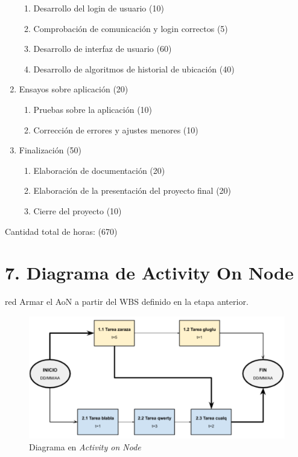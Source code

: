 \documentclass[11pt]{charter}
\begin{document}
\begin{enumerate}
\begin{enumerate}
	\item Desarrollo del login de usuario (10)
	\item Comprobación de comunicación y login correctos (5)
        \item Desarrollo de interfaz de usuario (60)
	\item Desarrollo de algoritmos de historial de ubicación (40)
	\end{enumerate}
\item Ensayos sobre aplicación (20)
	\begin{enumerate}
	\item Pruebas sobre la aplicación (10)
	\item Corrección de errores y ajustes menores (10)
	\end{enumerate}
\item Finalización (50)
	\begin{enumerate}
	\item Elaboración de documentación (20)
	\item Elaboración de la presentación del proyecto final (20)
	\item Cierre del proyecto (10)
	\end{enumerate}
\end{enumerate}

Cantidad total de horas: (670)
 


\section{7. Diagrama de Activity On Node}
\label{sec:AoN}

\begin{consigna}{red}
Armar el AoN a partir del WBS definido en la etapa anterior. 



\end{consigna}

\begin{figure}[htpb]
\centering 
\includegraphics[width=.8\textwidth]{./Figuras/AoN.png}
\caption{Diagrama en \textit{Activity on Node}}
\label{fig:AoN}
\end{figure}
\end{document}
